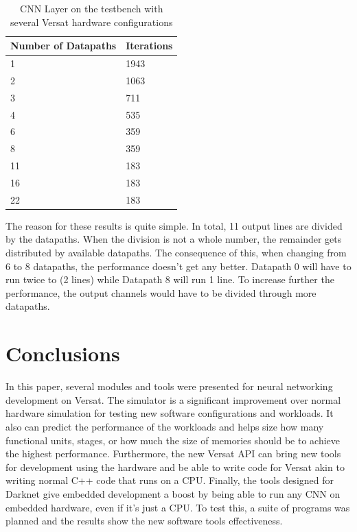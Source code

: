\documentclass[conference]{IEEEtran}
\begin{document}
\begin{table}[!htpb]
    \centering
    \begin{tabular}{ll}
    \hline
    \textbf{Number of Datapaths} &  \textbf{Iterations}        \\ \hline
    1          & 1943                 \\
	2          & 1063                 \\
	3          & 711                 \\
	4          & 535                 \\
	6          & 359                 \\
	8          & 359                 \\
	11          & 183                 \\
	16          & 183                 \\
    22            & 183                       \\  \hline
    \end{tabular}
    \label{table:Iterations}
    \linebreak
    \caption{CNN Layer on the testbench with several Versat hardware configurations}
\end{table}

The reason for these results is quite simple. In total, 11 output lines are divided
by the datapaths. When the division is not a whole number, the remainder gets distributed
by available datapaths. The consequence of this, when changing from 6 to 8 datapaths, the performance
doesn't get any better. Datapath 0 will have to run twice to (2 lines) while Datapath 8 will run 1 line.
To increase further the performance, the output channels would have to be divided through more datapaths.





\section{Conclusions}
\label{chapter:conclusions}

In this paper, several modules and tools were presented for neural networking development on Versat.
The simulator is a significant improvement over normal hardware simulation for testing new
software configurations and workloads. It also can predict the performance of the workloads
and helps size how many functional units, stages, or how much the size of memories should be
to achieve the highest performance.
Furthermore, the new Versat API can bring new tools for development using the hardware
and be able to write code for Versat akin to writing normal C++ code that runs on a CPU.
Finally, the tools designed for Darknet give embedded development a boost by being able to
run any CNN on embedded hardware, even if it's just a CPU.
To test this, a suite of programs was planned and the results show the new software tools
effectiveness.
\end{document}
